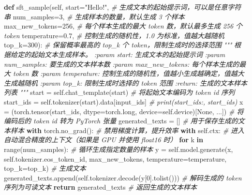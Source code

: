 \documentclass[
]{article}
\newenvironment{Shaded}{}{}
\newcommand{\BuiltInTok}[1]{\textcolor[rgb]{0.00,0.50,0.00}{#1}}
\newcommand{\CommentTok}[1]{\textcolor[rgb]{0.38,0.63,0.69}{\textit{#1}}}
\newcommand{\ControlFlowTok}[1]{\textcolor[rgb]{0.00,0.44,0.13}{\textbf{#1}}}
\newcommand{\DecValTok}[1]{\textcolor[rgb]{0.25,0.63,0.44}{#1}}
\newcommand{\FloatTok}[1]{\textcolor[rgb]{0.25,0.63,0.44}{#1}}
\newcommand{\KeywordTok}[1]{\textcolor[rgb]{0.00,0.44,0.13}{\textbf{#1}}}
\newcommand{\NormalTok}[1]{#1}
\newcommand{\OperatorTok}[1]{\textcolor[rgb]{0.40,0.40,0.40}{#1}}
\newcommand{\StringTok}[1]{\textcolor[rgb]{0.25,0.44,0.63}{#1}}
\newcommand{\VariableTok}[1]{\textcolor[rgb]{0.10,0.09,0.49}{#1}}
\begin{document}
\begin{Shaded}
\begin{Highlighting}[]
    \KeywordTok{def}\NormalTok{ sft\_sample(}\VariableTok{self}\NormalTok{, }
\NormalTok{               start}\OperatorTok{=}\StringTok{"Hello!"}\NormalTok{,  }\CommentTok{\# 生成文本的起始提示词，可以是任意字符串}
\NormalTok{               num\_samples}\OperatorTok{=}\DecValTok{3}\NormalTok{,  }\CommentTok{\# 生成样本的数量，默认生成 3 个样本}
\NormalTok{               max\_new\_tokens}\OperatorTok{=}\DecValTok{256}\NormalTok{,  }\CommentTok{\# 每个样本生成的最大 token 数，默认最多生成 256 个 token}
\NormalTok{               temperature}\OperatorTok{=}\FloatTok{0.7}\NormalTok{,  }\CommentTok{\# 控制生成的随机性，1.0 为标准，值越大越随机}
\NormalTok{               top\_k}\OperatorTok{=}\DecValTok{300}\NormalTok{):  }\CommentTok{\# 保留概率最高的 top\_k 个 token，限制生成时的选择范围}
        \CommentTok{"""}
\CommentTok{        根据给定的起始文本生成样本。}
\CommentTok{        }
\CommentTok{        :param start: 生成文本的起始提示词}
\CommentTok{        :param num\_samples: 要生成的文本样本数}
\CommentTok{        :param max\_new\_tokens: 每个样本生成的最大 token 数}
\CommentTok{        :param temperature: 控制生成的随机性，值越小生成越确定，值越大生成越随机}
\CommentTok{        :param top\_k: 限制生成时选择的 token 范围}
\CommentTok{        :return: 生成的文本样本列表}
\CommentTok{        """}
\NormalTok{        start }\OperatorTok{=} \VariableTok{self}\NormalTok{.chat\_template(start)}
        \CommentTok{\# 将起始文本编码为 token id 序列}
\NormalTok{        start\_ids }\OperatorTok{=} \VariableTok{self}\NormalTok{.tokenizer(start).data[}\StringTok{\textquotesingle{}input\_ids\textquotesingle{}}\NormalTok{]}
        \CommentTok{\# print(\textquotesingle{}start\_ids:\textquotesingle{}, start\_ids)}
\NormalTok{        x }\OperatorTok{=}\NormalTok{ (torch.tensor(start\_ids, dtype}\OperatorTok{=}\NormalTok{torch.}\BuiltInTok{long}\NormalTok{, device}\OperatorTok{=}\VariableTok{self}\NormalTok{.device)[}\VariableTok{None}\NormalTok{, ...])  }\CommentTok{\# 将编码后的 token id 转为 PyTorch 张量}
\NormalTok{        generated\_texts }\OperatorTok{=}\NormalTok{ []  }\CommentTok{\# 用于保存生成的文本样本}
        \ControlFlowTok{with}\NormalTok{ torch.no\_grad():  }\CommentTok{\# 禁用梯度计算，提升效率}
            \ControlFlowTok{with} \VariableTok{self}\NormalTok{.ctx:  }\CommentTok{\# 进入自动混合精度的上下文（如果是 GPU 并使用 float16 时）}
                \ControlFlowTok{for}\NormalTok{ k }\KeywordTok{in} \BuiltInTok{range}\NormalTok{(num\_samples):  }\CommentTok{\# 循环生成指定数量的样本}
\NormalTok{                    y }\OperatorTok{=} \VariableTok{self}\NormalTok{.model.generate(x, }\VariableTok{self}\NormalTok{.tokenizer.eos\_token\_id, max\_new\_tokens, temperature}\OperatorTok{=}\NormalTok{temperature, top\_k}\OperatorTok{=}\NormalTok{top\_k)  }\CommentTok{\# 生成文本}
\NormalTok{                    generated\_texts.append(}\VariableTok{self}\NormalTok{.tokenizer.decode(y[}\DecValTok{0}\NormalTok{].tolist()))  }\CommentTok{\# 解码生成的 token 序列为可读文本}
        \ControlFlowTok{return}\NormalTok{ generated\_texts  }\CommentTok{\# 返回生成的文本样本}



\end{Highlighting}
\end{Shaded}
\end{document}
